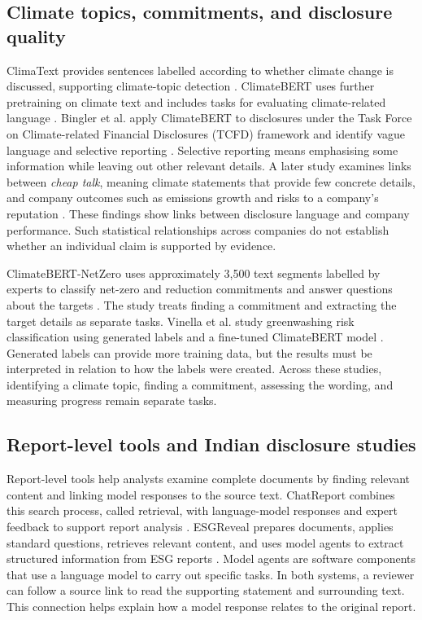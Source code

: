\subsection{Climate topics, commitments, and disclosure quality}

ClimaText provides sentences labelled according to whether climate change is discussed, supporting climate-topic detection \cite{varini2020}. ClimateBERT uses further pretraining on climate text and includes tasks for evaluating climate-related language \cite{webersinke2021}. Bingler et al. apply ClimateBERT to disclosures under the Task Force on Climate-related Financial Disclosures (TCFD) framework and identify vague language and selective reporting \cite{bingler2022}. Selective reporting means emphasising some information while leaving out other relevant details. A later study examines links between \emph{cheap talk}, meaning climate statements that provide few concrete details, and company outcomes such as emissions growth and risks to a company's reputation \cite{bingler2024}. These findings show links between disclosure language and company performance. Such statistical relationships across companies do not establish whether an individual claim is supported by evidence.

ClimateBERT-NetZero uses approximately 3,500 text segments labelled by experts to classify net-zero and reduction commitments and answer questions about the targets \cite{schimanski2023}. The study treats finding a commitment and extracting the target details as separate tasks. Vinella et al. study greenwashing risk classification using generated labels and a fine-tuned ClimateBERT model \cite{vinella2024}. Generated labels can provide more training data, but the results must be interpreted in relation to how the labels were created. Across these studies, identifying a climate topic, finding a commitment, assessing the wording, and measuring progress remain separate tasks.

\subsection{Report-level tools and Indian disclosure studies}

Report-level tools help analysts examine complete documents by finding relevant content and linking model responses to the source text. ChatReport combines this search process, called retrieval, with language-model responses and expert feedback to support report analysis \cite{ni2023}. ESGReveal prepares documents, applies standard questions, retrieves relevant content, and uses model agents to extract structured information from ESG reports \cite{zou2025}. Model agents are software components that use a language model to carry out specific tasks. In both systems, a reviewer can follow a source link to read the supporting statement and surrounding text. This connection helps explain how a model response relates to the original report.

